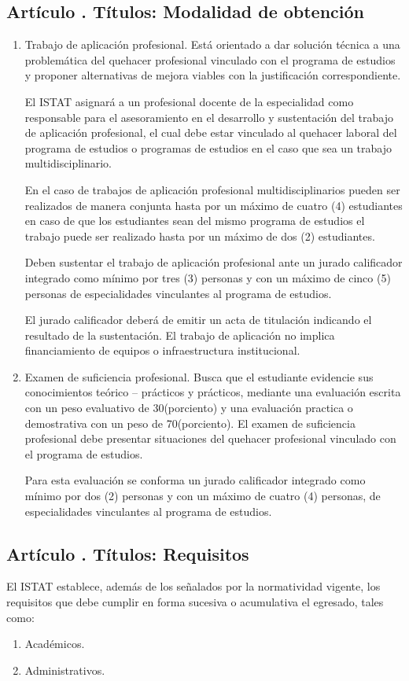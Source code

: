 \subsection{Artículo . Títulos: Modalidad de obtención}
\addtocounter{ns}{1}
\begin{enumerate}
\item Trabajo de aplicación profesional. Está orientado a dar solución técnica a una problemática del quehacer profesional vinculado con el programa de estudios y proponer alternativas de mejora viables con la justificación correspondiente.

El ISTAT asignará a un profesional docente de la especialidad como responsable para el asesoramiento en el desarrollo y sustentación del trabajo de aplicación profesional, el cual debe estar vinculado al quehacer laboral del programa de estudios o programas de estudios en el caso que sea un trabajo multidisciplinario.

En el caso de trabajos de aplicación profesional multidisciplinarios pueden ser realizados de manera conjunta hasta por un máximo de cuatro (4) estudiantes en caso de que los estudiantes sean del mismo programa de estudios el trabajo puede ser realizado hasta por un máximo de dos (2) estudiantes.

Deben sustentar el trabajo de aplicación profesional ante un jurado calificador integrado como mínimo por tres (3) personas y con un máximo de cinco (5) personas de especialidades vinculantes al programa de estudios. 

El jurado calificador deberá de emitir un acta de titulación indicando el resultado de la sustentación. El trabajo de aplicación no implica financiamiento de equipos o infraestructura institucional. 
\item Examen de suficiencia profesional. Busca que el estudiante evidencie sus conocimientos teórico – prácticos y prácticos, mediante una evaluación escrita con un peso evaluativo de 30(porciento) y una evaluación practica o demostrativa con un peso de 70(porciento). El examen de suficiencia profesional debe presentar situaciones del quehacer profesional vinculado con el programa de estudios.

Para esta evaluación se conforma un jurado calificador integrado como mínimo por dos (2) personas y con un máximo de cuatro (4) personas, de especialidades vinculantes al programa de estudios.
\end{enumerate}
\subsection{Artículo . Títulos: Requisitos}
\addtocounter{ns}{1}
El ISTAT establece, además de los señalados por la normatividad vigente, los requisitos que debe cumplir en forma sucesiva o acumulativa el egresado, tales como: 
\begin{enumerate}
\item Académicos.
\item Administrativos.  
\end{enumerate}
